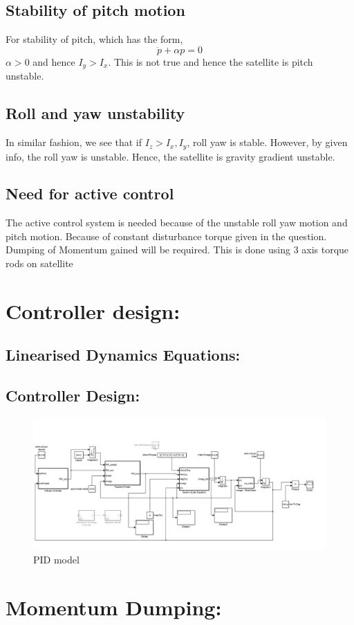 \documentclass[10pt,a4paper]{report}
\begin{document}
\section{Stability of pitch motion}
For stability of pitch, which has the form,
\begin{equation}
\ddot{p}+\alpha p=0
\end{equation}
$ \alpha>0 $ and hence $ I_{y}>I_{x} $. This is not true and hence the satellite is pitch unstable.
\section{Roll and yaw unstability}
In similar fashion, we see that if $ I_{z}>I_{x},I_{y} $, roll yaw is stable. However, by given info, the roll yaw is unstable. Hence, the satellite is gravity gradient unstable. 
\section{Need for active control}
The active control system is needed because of the unstable roll yaw motion and pitch motion. Because of constant disturbance torque given in the question. Dumping of Momentum gained will be required. This is done using 3 axis torque rods on satellite
\chapter{Controller design:}
\section{Linearised Dynamics Equations:}
\section{Controller Design:}
\begin{figure}[H]
\centering
\includegraphics[scale=0.3]{Untitled1.png}
\caption{PID model}
\end{figure}

\chapter{Momentum Dumping:}
\end{document}
